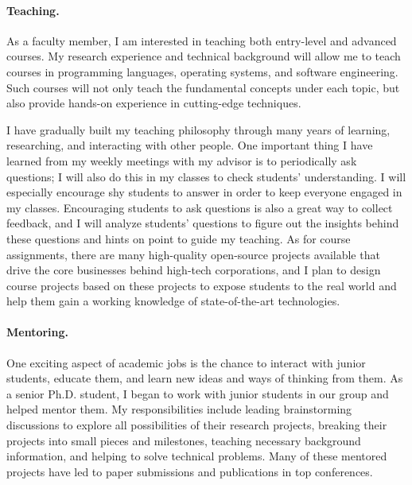 \documentclass[10pt]{article}
\begin{document}
\vspace{-0.1in}
\paragraph*{Teaching.}
As a faculty member, I am interested in teaching both entry-level and advanced courses. My research experience and technical background will allow me to teach courses in programming languages, operating systems, and software engineering. Such courses will not only teach the fundamental concepts under each topic, but also provide hands-on experience in cutting-edge techniques.

I have gradually built my teaching philosophy through many years of learning, researching, and interacting with other people. 
One important thing I have learned from my weekly meetings with my advisor is to periodically ask questions; I will also do this in my classes to check students' understanding. 
I will especially encourage shy students to answer in order to keep everyone engaged in my classes. 
Encouraging students to ask questions is also a great way to collect feedback, and I will analyze students' questions to figure out the insights behind these questions and
hints on point to guide my teaching. 
As for course assignments, there are many high-quality open-source projects
available that drive the core businesses behind high-tech corporations, and I plan to design course projects 
based on these projects to expose students to the real world and help them gain a working knowledge of state-of-the-art technologies.


\vspace{-0.1in}
\paragraph*{Mentoring.}
One exciting aspect of academic jobs is the chance to interact with junior students, educate them, and learn new ideas and ways of thinking from them. 
As a senior Ph.D. student, I began to work with junior students in
our group and helped mentor them. 
My responsibilities include leading brainstorming discussions to explore all
possibilities of their research projects, breaking their projects into small pieces and milestones, 
teaching necessary background information, and helping to solve technical problems. 
Many of these mentored projects have
led to paper submissions and publications in top conferences.
\end{document}

